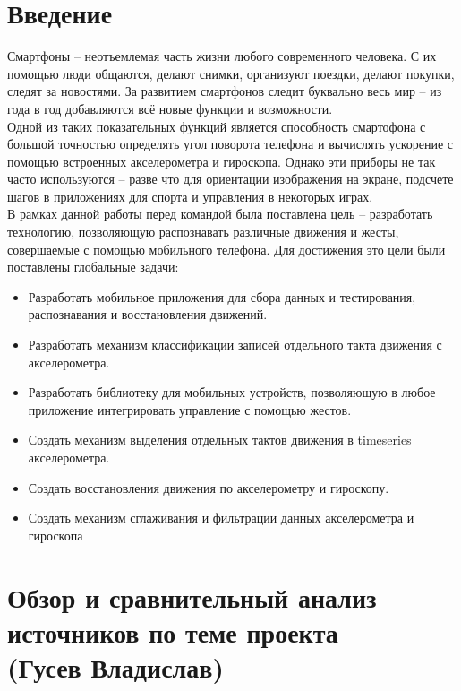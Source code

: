 \section{Введение}

Смартфоны -- неотъемлемая часть жизни любого современного человека. С их помощью люди общаются, делают снимки, организуют поездки, делают покупки, следят за новостями. За развитием смартфонов следит буквально весь мир -- из года в год добавляются всё новые функции и возможности. \\

Одной из таких показательных функций является способность смартофона с большой точностью определять угол поворота телефона и вычислять ускорение с помощью встроенных акселерометра и гироскопа. Однако эти приборы не так часто используются -- разве что для ориентации изображения на экране, подсчете шагов в приложениях для спорта и управления в некоторых играх. \\

В рамках данной работы перед командой была поставлена цель -- разработать технологию, позволяющую распознавать различные движения и жесты, совершаемые с помощью мобильного телефона. Для достижения это цели были поставлены глобальные задачи:

\begin{itemize}
    \item Разработать мобильное приложения для сбора данных и тестирования, распознавания и восстановления движений.
    \item Разработать механизм классификации записей отдельного такта движения с акселерометра.
    \item Разработать библиотеку для мобильных устройств, позволяющую в любое приложение интегрировать управление с помощью жестов.
    \item Создать механизм выделения отдельных тактов движения в timeseries акселерометра.
    \item Создать восстановления движения по акселерометру и гироскопу.
    \item Создать механизм сглаживания и фильтрации данных акселерометра и гироскопа
\end{itemize}

\section{Обзор и сравнительный анализ источников по теме проекта \\ (Гусев Владислав)}

